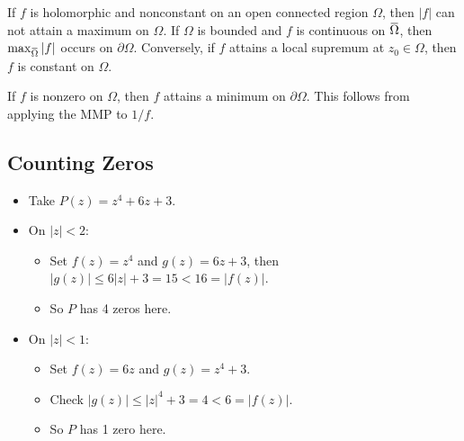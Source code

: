 
\begin{corollary}\label{MaximumModulus}

If \(f\) is holomorphic and nonconstant on an open connected region
\(\Omega\), then \({\left\lvert {f} \right\rvert}\) can not attain a
maximum on \(\Omega\). If \(\Omega\) is bounded and \(f\) is continuous
on
\(\mkern 1.5mu\overline{\mkern-1.5mu\Omega\mkern-1.5mu}\mkern 1.5mu\),
then
\(\max_{\mkern 1.5mu\overline{\mkern-1.5mu\Omega\mkern-1.5mu}\mkern 1.5mu} {\left\lvert {f} \right\rvert}\)
occurs on \({{\partial}}\Omega\). Conversely, if \(f\) attains a local
supremum at \(z_0 \in \Omega\), then \(f\) is constant on \(\Omega\).

\end{corollary}


\begin{corollary}[?]

If \(f\) is nonzero on \(\Omega\), then \(f\) attains a minimum on
\({{\partial}}\Omega\). This follows from applying the MMP to \(1/f\).

\end{corollary}

\hypertarget{counting-zeros}{%
\subsection{Counting Zeros}\label{counting-zeros}}

\begin{example}

\envlist

\begin{itemize}
\tightlist
\item
  Take \(P(z) = z^4 + 6z + 3\).
\item
  On \({\left\lvert {z} \right\rvert} < 2\):

  \begin{itemize}
  \tightlist
  \item
    Set \(f(z) = z^4\) and \(g(z) = 6z + 3\), then
    \({\left\lvert {g(z)} \right\rvert} \leq 6{\left\lvert {z} \right\rvert} + 3 = 15 < 16= {\left\lvert {f(z)} \right\rvert}\).
  \item
    So \(P\) has 4 zeros here.
  \end{itemize}
\item
  On \({\left\lvert {z} \right\rvert} < 1\):

  \begin{itemize}
  \tightlist
  \item
    Set \(f(z) = 6z\) and \(g(z) = z^4 + 3\).
  \item
    Check
    \({\left\lvert {g(z)} \right\rvert} \leq {\left\lvert {z} \right\rvert}^4 + 3 = 4 < 6 = {\left\lvert {f(z)} \right\rvert}\).
  \item
    So \(P\) has 1 zero here.
  \end{itemize}
\end{itemize}

\end{example}

